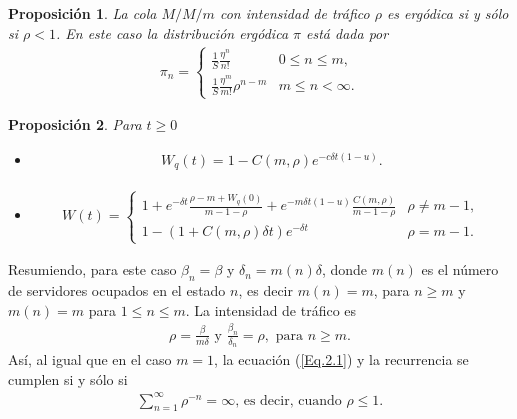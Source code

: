\documentclass{article}
\newtheorem{Prop}{Proposición}[section]
\numberwithin{equation}{section}
\begin{document}
\begin{Prop}
La cola $M/M/m$ con intensidad de tr\'afico $\rho$ es erg\'odica si y s\'olo si $\rho<1$. En este caso la distribuci\'on erg\'odica $\pi$ est\'a dada por
\begin{eqnarray}
\pi_{n}=\left\{\begin{array}{cc}
\frac{1}{S}\frac{\eta^{n}}{n!} & 0\leq n\leq m,\\
\frac{1}{S}\frac{\eta^{m}}{m!}\rho^{n-m} & m\leq n<\infty.
\end{array}\right.
\end{eqnarray}
\end{Prop}

\begin{Prop}
Para $t\geq0$
\begin{itemize}
\item[a)]
\begin{eqnarray}
W_{q}\left(t\right)=1-C\left(m,\rho\right)e^{-c\delta
t\left(1-u\right)}.
\end{eqnarray} 
\item[b)]\begin{eqnarray}
W\left(t\right)=\left\{\begin{array}{cc}
1+e^{-\delta t}\frac{\rho-m+W_{q}\left(0\right)}{m-1-\rho}+e^{-m\delta t\left(1-u\right)}\frac{C\left(m,\rho\right)}{m-1-\rho} & \rho\neq m-1,\\
1-\left(1+C\left(m,\rho\right)\delta t\right)e^{-\delta t} & \rho=m-1.
\end{array}\right.
\end{eqnarray}
\end{itemize}
\end{Prop}

Resumiendo, para este caso $\beta_{n}=\beta$ y $\delta_{n}=m\left(n\right)\delta$, donde $m\left(n\right)$ es el n\'umero de servidores ocupados en el estado $n$, es decir $m\left(n\right)=m$, para $n\geq m$ y $m\left(n\right)=m$ para $1\leq n\leq m$. La intensidad de tr\'afico es 
\begin{eqnarray}
\rho=\frac{\beta}{m\delta}\textrm{ y }\frac{\beta_{n}}{\delta_{n}}=\rho,\textrm{ para }n\geq m.
\end{eqnarray}
As\'i, al igual que en el caso $m=1$, la ecuaci\'on (\ref{Eq.2.1}) y la recurrencia se cumplen si y s\'olo si 
\begin{eqnarray}
\sum_{n=1}^{\infty}\rho^{-n}=\infty\textrm{, es decir, cuando }\rho\leq1.
\end{eqnarray}
 
\end{document}
